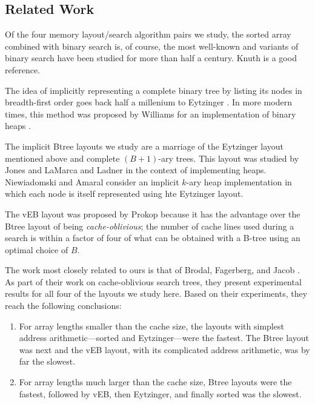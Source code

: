 \documentclass{patmorin}
\begin{document}
\subsection{Related Work}

Of the four memory layout/search algorithm pairs we study, the sorted
array combined with binary search is, of course, the most well-known
and variants of binary search have been studied for more than half a
century. Knuth \cite[Section~6.2.1]{knuth:art} is a good reference.

The idea of implicitly representing a complete binary tree by listing
its nodes in breadth-first order goes back half a millenium to Eytzinger
\cite{eytzinger:thesaurus}. In more modern times, this method was proposed by
Williams for an implementation of binary heaps \cite{williams:algorithm}.

The implicit Btree layouts we study are a marriage of the Eytzinger
layout mentioned above and complete $(B+1)$-ary trees. This layout
was studied by Jones \cite{jones:empirical} and LaMarca and Ladner
\cite{lamarca.ladner:influence} in the context of implementing heaps.
Niewiadomski and Amaral \cite{niewiadomski.amaral:chopping} consider
an implicit $k$-ary heap implementation in which each node is itself
represented using hte Eytzinger layout.

The vEB layout was proposed by Prokop
\cite[Section~10.2]{prokop:cache-oblivious} because it has the advantage
over the Btree layout of being \emph{cache-oblivious}; the number of
cache lines used during a search is within a factor of four of what can
be obtained with a B-tree using an optimal choice of $B$.


The work most closely related to ours is that of Brodal, Fagerberg,
and Jacob \cite{brodal.fagerberg.ea:cache}. As part of their work on
cache-oblivious search trees, they present experimental results for
all four of the layouts we study here.  Based on their experiments,
they reach the following conclusions:

\begin{enumerate}

\item For array lengths smaller than the cache size, the layouts with
simplest address arithmetic---sorted and Eytzinger---were the fastest. The
Btree layout was next and the vEB layout, with its complicated address
arithmetic, was by far the slowest.

\item For array lengths much larger than the cache size, Btree layouts
were the fastest, followed by vEB, then Eytzinger, and finally sorted
was the slowest.
\end{enumerate}
\end{document}

